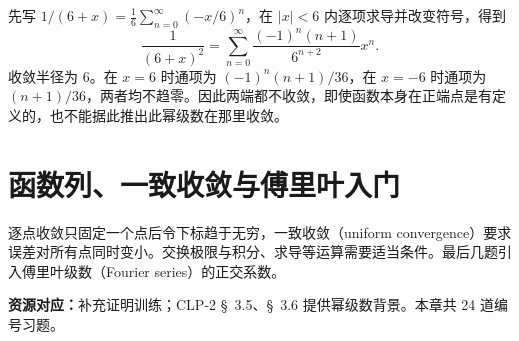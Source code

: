 \documentclass[12pt,fontset=fandol]{ctexart}
\begin{document}
\begin{solve}\label{ans:c27q24}
先写 $1/(6+x)=\frac{1}{6}\sum_{n=0}^\infty(-x/6)^n$，在 $|x|<6$ 内逐项求导并改变符号，得到
\[
\frac1{(6+x)^2}=\sum_{n=0}^\infty\frac{(-1)^n(n+1)}{6^{n+2}}x^n.
\]
收敛半径为 $6$。在 $x=6$ 时通项为 $(-1)^n(n+1)/36$，在 $x=-6$ 时通项为 $(n+1)/36$，两者均不趋零。因此两端都不收敛，即使函数本身在正端点是有定义的，也不能据此推出此幂级数在那里收敛。
\end{solve}

\clearpage
\section{函数列、一致收敛与傅里叶入门}\label{sec:ch28}
逐点收敛只固定一个点后令下标趋于无穷，一致收敛（uniform convergence）要求误差对所有点同时变小。交换极限与积分、求导等运算需要适当条件。最后几题引入傅里叶级数（Fourier series）的正交系数。

\textbf{资源对应：}补充证明训练；CLP-2 \S~3.5、\S~3.6 提供幂级数背景。本章共 24 道编号习题。
\end{document}

